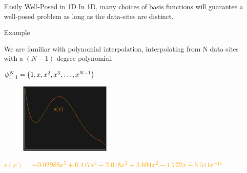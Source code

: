 \documentclass[12pt,t]{beamer}
\newcommand{\subt}[1]{{\footnotesize \color{subtitle} {#1}}}
\begin{document}
\begin{frame}{Easily Well-Posed in 1D}
In 1D, many choices of basis functions will guarantee a well-posed problem as long as the data-sites are distinct. 
\bigskip

\subt{Example}

We are familiar with \subt{polynomial interpolation}, interpolating from N data sites with a $(N-1)$-degree polynomial. 
\begin{center}
$\psi_{i=1}^N=\{1,x,x^2,x^3, \mathellipsis, x^{N-1}\}$
\end{center}
\begin{figure}
\includegraphics[width=0.4\textwidth, keepaspectratio]{fig3.png}
\end{figure}
\footnotesize{\textcolor{orange}{$s(x)=-0.02988 x^5 + 0.417 x^4 - 2.018 x^3 + 3.694 x^2 - 1.722 x - 5.511e^{-14}$}}
\note{}
\end{frame}
\end{document}
